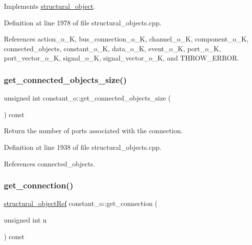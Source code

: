 Implements \hyperlink{classstructural__object_a3a8b2d38c2b5666700053a72868bb6b2}{structural\+\_\+object}.



Definition at line 1978 of file structural\+\_\+objects.\+cpp.



References action\+\_\+o\+\_\+K, bus\+\_\+connection\+\_\+o\+\_\+K, channel\+\_\+o\+\_\+K, component\+\_\+o\+\_\+K, connected\+\_\+objects, constant\+\_\+o\+\_\+K, data\+\_\+o\+\_\+K, event\+\_\+o\+\_\+K, port\+\_\+o\+\_\+K, port\+\_\+vector\+\_\+o\+\_\+K, signal\+\_\+o\+\_\+K, signal\+\_\+vector\+\_\+o\+\_\+K, and T\+H\+R\+O\+W\+\_\+\+E\+R\+R\+OR.

\mbox{\label{classconstant__o_a87c4947f107b7d197cd53ca7d5e2be2c}} 
\subsubsection{\texorpdfstring{get\+\_\+connected\+\_\+objects\+\_\+size()}{get\_connected\_objects\_size()}}
{\footnotesize\ttfamily unsigned int constant\+\_\+o\+::get\+\_\+connected\+\_\+objects\+\_\+size (\begin{DoxyParamCaption}{ }\end{DoxyParamCaption}) const}



Return the number of ports associated with the connection. 



Definition at line 1938 of file structural\+\_\+objects.\+cpp.



References connected\+\_\+objects.

\mbox{\label{classconstant__o_a43fed55fb6a6973a531164ab41f1a5c0}} 
\subsubsection{\texorpdfstring{get\+\_\+connection()}{get\_connection()}}
{\footnotesize\ttfamily \hyperlink{structural__objects_8hpp_a8ea5f8cc50ab8f4c31e2751074ff60b2}{structural\+\_\+object\+Ref} constant\+\_\+o\+::get\+\_\+connection (\begin{DoxyParamCaption}\item[{unsigned int}]{n }\end{DoxyParamCaption}) const}



